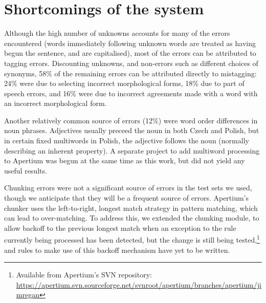 \documentclass[11pt]{article}
\begin{document}
\section{Shortcomings of the system}

Although the high number of unknowns accounts for %
many
of the errors encountered (words immediately following unknown words are treated
as having begun the sentence, and are capitalised),
most of the errors can be attributed to tagging errors. 
Discounting unknowns, and non-errors such as different choices of synonyms,
58\% of the remaining errors can be attributed directly to mistagging: 24\% 
were due to selecting incorrect morphological forms, 18\% due to part of speech
errors, and 16\% were due to incorrect agreements made with a word with an incorrect
morphological form.


Another relatively common source of errors (12\%) were word order differences in noun phrases.
Adjectives usually preceed the noun in both Czech and Polish, but in certain fixed 
multiwords in Polish, the adjective follows the noun (normally describing an 
inherent property). A separate project to add
multiword processing to Apertium was begun at the same time as this work, but
did not yield any useful results. 

Chunking errors were not a significant source of errors in the test sets we used,
though we anticipate that they will be a frequent source of errors. Apertium's
chunker uses the left-to-right, longest match strategy in pattern matching,
which can lead to over-matching. To address this, we extended the chunking 
module, to allow backoff to the previous longest match when an exception
to the rule currently being processed has been detected, but the change is
still being tested,\footnote{Available from Apertium's SVN repository:
\url{https://apertium.svn.sourceforge.net/svnroot/apertium/branches/apertium/jimregan}
} and rules to make use of this backoff mechanism have
yet to be written. 
\end{document}

